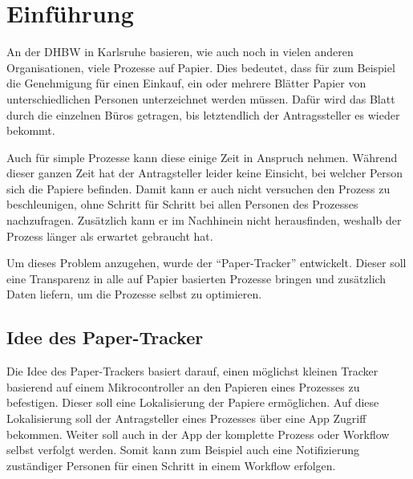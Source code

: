\chapter{Einführung}

An der \gls{DHBW} in Karlsruhe basieren, wie auch noch in vielen anderen Organisationen, viele Prozesse auf Papier.
Dies bedeutet, dass für zum Beispiel die Genehmigung für einen Einkauf, ein oder mehrere Blätter Papier von unterschiedlichen Personen unterzeichnet werden müssen.
Dafür wird das Blatt durch die einzelnen Büros getragen, bis letztendlich der Antragssteller es wieder bekommt.

Auch für simple Prozesse kann diese einige Zeit in Anspruch nehmen.
Während dieser ganzen Zeit hat der Antragsteller leider keine Einsicht, bei welcher Person sich die Papiere befinden.
Damit kann er auch nicht versuchen den Prozess zu beschleunigen, ohne Schritt für Schritt bei allen Personen des Prozesses nachzufragen.
Zusätzlich kann er im Nachhinein nicht herausfinden, weshalb der Prozess länger als erwartet gebraucht hat.

Um dieses Problem anzugehen, wurde der \enquote{Paper-Tracker} entwickelt.
Dieser soll eine Transparenz in alle auf Papier basierten Prozesse bringen und zusätzlich Daten liefern, um die Prozesse selbst zu optimieren.

\section{Idee des Paper-Tracker}

Die Idee des Paper-Trackers basiert darauf, einen möglichst kleinen Tracker basierend auf einem Mikrocontroller an den Papieren eines Prozesses zu befestigen.
Dieser soll eine Lokalisierung der Papiere ermöglichen.
Auf diese Lokalisierung soll der Antragsteller eines Prozesses über eine App Zugriff bekommen.
Weiter soll auch in der App der komplette Prozess oder Workflow selbst verfolgt werden.
Somit kann zum Beispiel auch eine Notifizierung zuständiger Personen für einen Schritt in einem Workflow erfolgen.